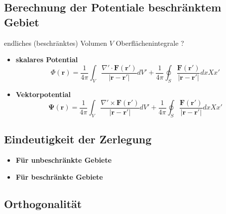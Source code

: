 \subsection{Berechnung der Potentiale beschränktem Gebiet
\label{helmholtz:subsection:BerechnungBeschr}}

endliches (beschränktes) Volumen $V$ Oberflächenintegrale ?

\begin{itemize}
\item \textbf{skalares Potential}
\begin{equation}
\Phi (\mathbf{r}) = \frac{1}{4\pi} \int_V \frac{\nabla' \cdot \mathbf{F}(\mathbf{r}')}{|\mathbf{r} - \mathbf{r}'|} dV' + \frac{1}{4\pi} \oint_S \frac{\mathbf{F}(\mathbf{r}')}{|\mathbf{r} - \mathbf{r}'|} dxXx'
\end{equation}
\item \textbf{Vektorpotential}
\begin{equation}
\mathbf{\Psi}(\mathbf{r}) = \frac{1}{4\pi} \int_V \frac{\nabla' \times \mathbf{F}(\mathbf{r}')}{|\mathbf{r} - \mathbf{r}'|} dV' + \frac{1}{4\pi} \oint_S \frac{\mathbf{F}(\mathbf{r}')}{|\mathbf{r} - \mathbf{r}'|} dxXx'
\end{equation}
\end{itemize}


\subsection{Eindeutigkeit der Zerlegung 
\label{helmholtz:subsection:EindeutigkeitS}}

\begin{itemize}
\item \textbf{Für unbeschränkte Gebiete}
\item \textbf{Für beschränkte Gebiete}
\end{itemize}


\subsection{Orthogonalität
\label{helmholtz:subsection:Orthogonalitaet}}

